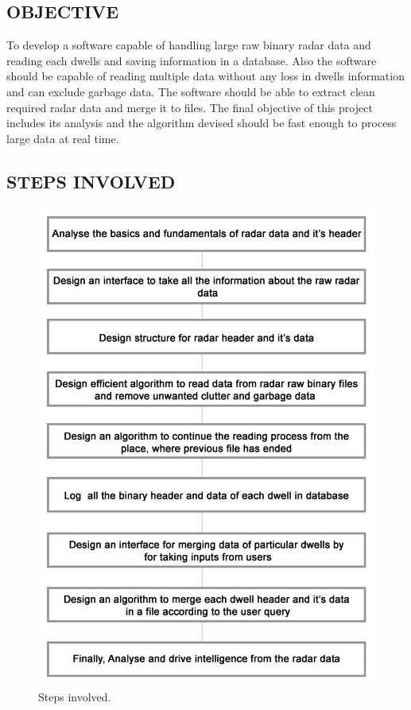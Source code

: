 \documentclass[14pt]{article} %
\begin{document}
\subsection{OBJECTIVE}
 To develop a software capable of handling large raw binary radar data and reading each dwells and saving information in a database. Also the software should be capable of reading multiple data without any loss in dwells information and can exclude garbage data. The software should be able to extract clean required radar data and merge it to files. The final objective of this project includes its analysis and the algorithm devised should be fast enough to process large data at real time. 
 
 \pagebreak
 \subsection{STEPS INVOLVED}
 \begin{figure}[H]
  \includegraphics[width=\linewidth]{steps.png}
  \caption{Steps involved.}
  \label{fig:figure 1}
\end{figure}
\end{document}
